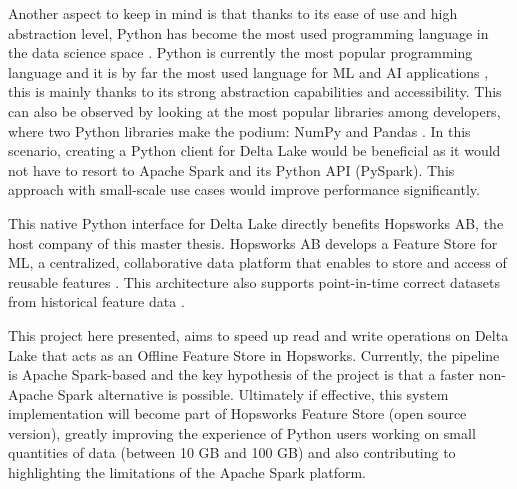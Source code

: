Another aspect to keep in mind is that thanks to its ease of use and high abstraction level, Python has become the most used programming language in the data science space \cite{nagpalPythonDataAnalytics2019}. Python is currently the most popular programming language \cite{TIOBEIndex, StackOverflowDeveloper} and it is by far the most used language for \gls{ML} and \gls{AI} applications \cite{python-machine-learning}, this is mainly thanks to its strong abstraction capabilities and accessibility. This can also be observed by looking at the most popular libraries among developers, where two Python libraries make the podium: NumPy and Pandas \cite{StackOverflowDeveloper}.
In this scenario, creating a Python client for Delta Lake would be beneficial as it would not have to resort to Apache Spark and its Python \gls{API} (PySpark). This approach with small-scale use cases would improve performance significantly.

This native Python interface for Delta Lake directly benefits Hopsworks AB, the host company of this master thesis. Hopsworks AB develops a Feature Store for \gls{ML}, a centralized, collaborative data platform that enables to store and access of reusable features \cite{HopsworksBatchRealtime2024}. This architecture also supports point-in-time correct datasets from historical feature data \cite{Pettersson1695672}.

This project here presented, aims to speed up read and write operations on Delta Lake that acts as an Offline Feature Store in Hopsworks. Currently, the pipeline is Apache Spark-based and the key hypothesis of the project is that a faster non-Apache Spark alternative is possible. Ultimately if effective, this system implementation will become part of Hopsworks Feature Store (open source version), greatly improving the experience of Python users working on small quantities of data (between 10 GB and 100 GB) and also contributing to highlighting the limitations of the Apache Spark platform.